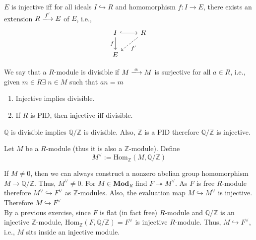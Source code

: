 \documentclass[oneside, 12pt]{scrbook}
\newcommand{\QQ}{\mathbb Q}
\newcommand{\ZZ}{\mathbb Z}
\newcommand{\Hom}{\mathrm{Hom}}
\theoremstyle{theorem}
\begin{document}
\begin{theorem}
$E$ is injective iff for all ideals $I \hookrightarrow R$ and homomorphism $f: I \rightarrow E$, there exists an extension $R \xlongrightarrow{f'} E$ of $E$, i.e., 
\[\begin{tikzcd}
	I & R \\
	E
	\arrow[hook, from=1-1, to=1-2]
	\arrow["f"', from=1-1, to=2-1]
	\arrow["{f'}", dashed, from=1-2, to=2-1]
\end{tikzcd}\]
\end{theorem}

\begin{definition}
We say that a $R$-module is divisible if $M \xlongrightarrow{\alpha}M$ is surjective for all $a\in R$, i.e., given $m \in R \exists \; n \in M$ such that $an=m$
\end{definition}

\begin{exercise}
\begin{enumerate}
\item Injective implies divisible.
\item If $R$ is PID, then injective iff divisible.
\end{enumerate}
\end{exercise}

\begin{remark}
$\QQ$ is divisible implies $\QQ/\ZZ$ is divisible. Also, $\ZZ$ is a PID therefore $\QQ/\ZZ$ is injective.
\end{remark}

\begin{definition}
Let $M$ be a $R$-module (thus it is also a $\ZZ$-module). Define 
\begin{equation*}
M^{\vee} := \Hom_{\ZZ}(M, \QQ / \ZZ)
\end{equation*}
\end{definition}

\begin{remark}
If $M \neq 0$, then we can always construct a nonzero abelian group homomorphism $M \rightarrow \QQ/\ZZ$. Thus, $M^{\vee} \neq 0$. For $M \in \mathbf{Mod}_{R}$ find $F \twoheadrightarrow M^{\vee}$. As $F$ is free $R$-module therefore $M^{\vee} \hookrightarrow F^{\vee}$ as $\ZZ$-modules. Also, the evaluation map $M \hookrightarrow M^{\vee}$ is injective. Therefore $M \hookrightarrow F^{\vee}$\\

By a previous exercise, since $F$ is flat (in fact free) $R$-module and $\QQ/\ZZ$ is an injective $\ZZ$-module, $\Hom_{\ZZ}(F, \QQ/\ZZ) = F^{\vee}$ is injective $R$-module. Thus, $M \hookrightarrow F^{\vee}$, i.e., $M$ sits inside an injective module.
\end{remark}
\end{document}
